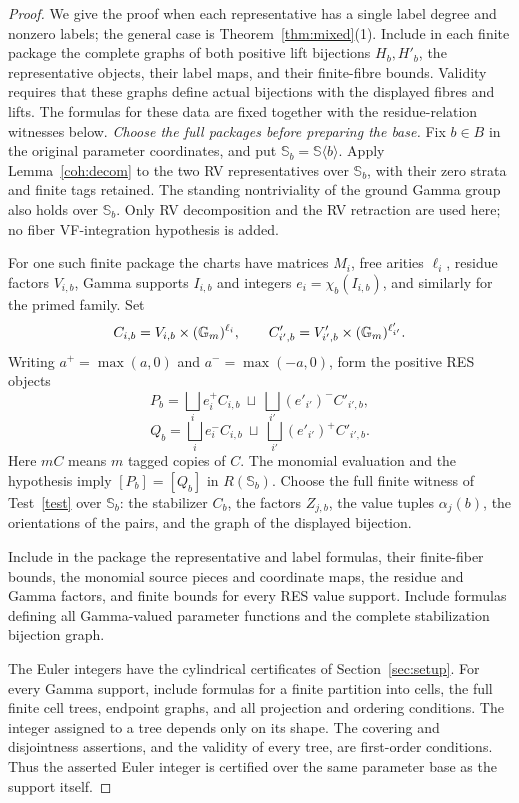 \begin{proof}
We give the proof when each representative has a single label degree
and nonzero labels; the general case is Theorem~\ref{thm:mixed}(1).
Include in each finite package the complete graphs of both positive
lift bijections $H_b,H'_b$, the representative objects, their label maps,
and their finite-fibre bounds. Validity requires that these graphs define
actual bijections with the displayed fibres and lifts. The formulas for
these data are fixed together with the residue-relation witnesses below.
\medskip
\noindent\emph{Choose the full packages before preparing the base.}
Fix $b\in B$ in the original parameter
coordinates, and put $\mathbb S_b=\mathbb S\langle b\rangle$.
Apply Lemma~\ref{coh:decom} to the two RV representatives over
$\mathbb S_b$, with their zero strata and finite tags retained.
The standing nontriviality of the ground Gamma group
also holds over $\mathbb S_b$.
Only RV decomposition and the RV retraction are used here;
no fiber VF-integration hypothesis is added.

For one such finite package the charts have matrices $M_i$,
free arities $\ell_i$, residue factors $V_{i,b}$,
Gamma supports $I_{i,b}$ and integers
$e_i=\chi_b(I_{i,b})$, and similarly for the primed family.
Set
\[
 C_{i,b}=V_{i,b}\times(\mathbb G_m)^{\ell_i},
 \qquad C'_{i',b}=V'_{i',b}\times(\mathbb G_m)^{\ell'_{i'}}.
\]
Writing $a^+=\max(a,0)$ and $a^-=\max(-a,0)$, form the
positive RES objects
\[
 P_b=\bigsqcup_i e_i^+ C_{i,b}
       \ \sqcup\ \bigsqcup_{i'}(e'_{i'})^- C'_{i',b},
\]
\[
 Q_b=\bigsqcup_i e_i^- C_{i,b}
       \ \sqcup\ \bigsqcup_{i'}(e'_{i'})^+ C'_{i',b}.
\]
Here $mC$ means $m$ tagged copies of $C$.
The monomial evaluation and the hypothesis imply
$[P_b]=[Q_b]$ in $R(\mathbb S_b)$.
Choose the full finite witness of Test~\ref{test} over
$\mathbb S_b$: the stabilizer $C_b$, the factors $Z_{j,b}$,
the value tuples $\alpha_j(b)$, the orientations of the
pairs, and the graph of the displayed bijection.

Include in the package the representative and label
formulas, their finite-fiber bounds, the monomial source
pieces and coordinate maps, the residue and Gamma factors,
and finite bounds for every RES value support.
Include formulas defining all Gamma-valued parameter
functions and the complete stabilization bijection graph.

The Euler integers have the cylindrical certificates of
Section~\ref{sec:setup}. For every Gamma support, include formulas for a
finite partition into cells, the full finite cell trees, endpoint graphs,
and all projection and ordering conditions. The integer assigned to a
tree depends only on its shape. The covering and disjointness assertions,
and the validity of every tree, are first-order conditions. Thus the
asserted Euler integer is certified over the same parameter base as the
support itself.


\end{proof}
